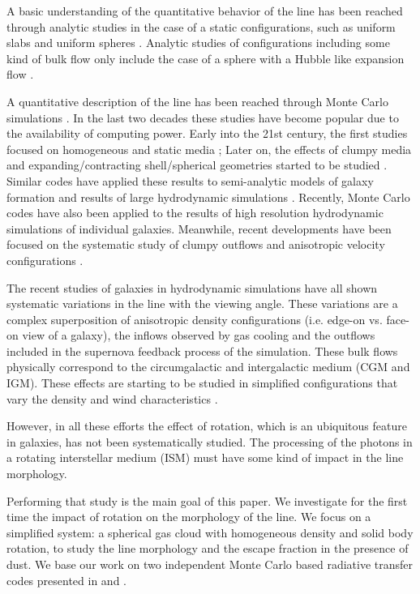 \documentclass{emulateapj}
\newcommand{\ly}{{\ifmmode{{\rm Ly}\alpha~}\else{Ly$\alpha$~}\fi}}
\begin{document}
A basic understanding of the quantitative behavior of the \ly line
has been reached through analytic studies in the case of a static
configurations, such as uniform slabs
\citep{Adams72,Harrington73,Neufeld90} and uniform spheres
\citep{Dijkstra06}. Analytic studies of configurations including
some kind of bulk flow only include the case of a sphere with a Hubble
like expansion flow \citep{LoebRybicki}. 

A quantitative description of the \ly line has been reached through
Monte Carlo simulations \citep{Auer68,Avery68,Adams72}. In the last
two decades these studies have become popular due to the
availability of computing power. Early into the 21st century, the first
studies focused on homogeneous and static media
\citep{Ahn00,Ahn01,Zheng02}; Later on, the effects of clumpy media
\citep{Hansen06} and expanding/contracting shell/spherical geometries started to
be studied \citep{Verhamme06,Dijkstra06,Ahn2014}. Similar codes have applied
these results to semi-analytic models of galaxy formation \citep{Orsi12} and
results of large hydrodynamic simulations
\citep{CLARA,Forero12,Behrens13}. Recently, Monte Carlo codes have also
been applied to the results of high resolution hydrodynamic
simulations of individual
galaxies\citep{Laursen09,Barnes11,Verhamme12,Yajima12}. Meanwhile, recent
developments have been focused on the systematic study of clumpy
outflows \citep{DijkstraKramer}and anisotropic velocity configurations
\citep{Zheng2013}. 

The recent studies of galaxies in hydrodynamic simulations
\citep{Laursen09,Barnes11,Verhamme12,Yajima12} have all shown
systematic variations in the \ly line with the viewing angle. These
variations are a complex superposition of anisotropic density
configurations (i.e. edge-on vs. face-on view of a galaxy), the
inflows observed by gas cooling and the outflows included in the
supernova feedback process of the simulation. These bulk flows
physically correspond to the circumgalactic and intergalactic medium
(CGM and IGM). These effects are starting to be studied
 in simplified configurations that vary the density and wind
 characteristics \citep{Zheng2013}. 

However, in all these efforts the effect of rotation,
which is an ubiquitous feature in galaxies, has not been
systematically studied. The processing of the \ly photons in a
rotating interstellar medium (ISM) must have some kind of impact in
the \ly line morphology. 

Performing that study is the main goal of this paper. We investigate for the
first time the impact of rotation on the morphology of the \ly
line. We focus on a simplified system: a spherical gas cloud with
homogeneous density and solid body rotation, to study the line
morphology and the escape fraction in the presence of dust. We base
our work on two independent Monte Carlo based radiative transfer codes
presented in \cite{CLARA} and \cite{DijkstraKramer}.   
  
\end{document}
